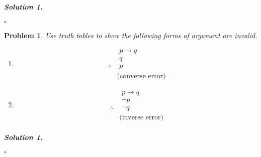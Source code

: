 \documentclass{amsart}
\theoremstyle{plain}
\newtheorem{problem}{Problem}
\newenvironment{solution}{\paragraph{\emph{Solution 1}.}}{\hfill$\square$}
\begin{document}
\begin{solution}

\end{solution}

\begin{problem}
Use truth tables to show the following forms of argument are invalid.
\begin{enumerate}
\item
\begin{equation*}
\begin{aligned}
& \,\,p \to q \\
& \,\, q \\
\therefore & \,\, p \\
& \text{(converse error)}
\end{aligned}
\end{equation*}
\item
\begin{equation*}
\begin{aligned}
& \,\,p \to q \\
& \,\, \neg p \\
\therefore & \,\, \neg q \\
& \text{(inverse error)}
\end{aligned}
\end{equation*}
\end{enumerate}
\end{problem}

\begin{solution}

\end{solution}
\end{document}
